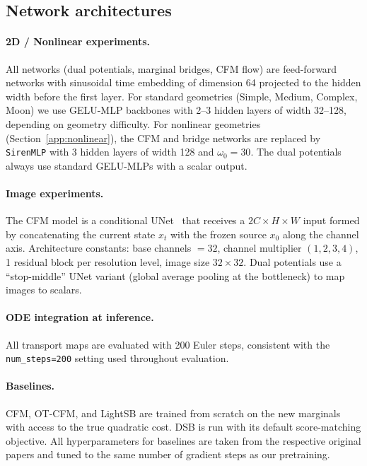 \documentclass[11pt]{article}
\theoremstyle{definition}
\numberwithin{equation}{section}%
\begin{document}
\subsection{Network architectures}
\label{app:arch}

\paragraph{2D / Nonlinear experiments.}
All networks (dual potentials, marginal bridges, CFM flow) are feed-forward
networks with sinusoidal time embedding of dimension 64 projected to the
hidden width before the first layer.
For standard geometries (Simple, Medium, Complex, Moon) we use GELU-MLP
backbones with 2--3 hidden layers of width 32--128, depending on geometry
difficulty.
For nonlinear geometries (Section~\ref{app:nonlinear}), the CFM and bridge
networks are replaced by \texttt{SirenMLP} with 3 hidden layers of width
128 and $\omega_0 = 30$.
The dual potentials always use standard GELU-MLPs with a scalar output.

\paragraph{Image experiments.}
The CFM model is a conditional UNet~\citep{ronneberger2015unet} that receives
a $2C\!\times\!H\!\times\!W$ input formed by concatenating the current state
$x_t$ with the frozen source $x_0$ along the channel axis.
Architecture constants: base channels $= 32$, channel multiplier $(1,2,3,4)$,
1 residual block per resolution level, image size $32\!\times\!32$.
Dual potentials use a ``stop-middle'' UNet variant (global average pooling
at the bottleneck) to map images to scalars.

\paragraph{ODE integration at inference.}
All transport maps are evaluated with 200 Euler steps, consistent with the
\texttt{num\_steps=200} setting used throughout evaluation.

\paragraph{Baselines.}
CFM, OT-CFM, and LightSB are trained from scratch on the new marginals
with access to the true quadratic cost.
DSB is run with its default score-matching objective.
All hyperparameters for baselines are taken from the respective original
papers and tuned to the same number of gradient steps as our pretraining.
\end{document}
